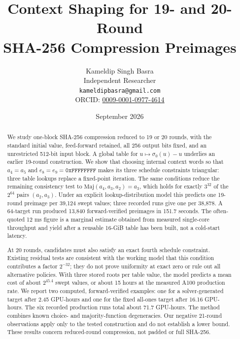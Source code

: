 \documentclass[11pt,a4paper]{article}
\newcommand{\Maj}{\mathrm{Maj}}
\newcommand{\hex}[1]{\texttt{#1}}
\begin{document}
\title{\textbf{Context Shaping for 19- and 20-Round\\
       SHA-256 Compression Preimages}}

\author{Kameldip Singh Basra \\[4pt]
        \small Independent Researcher \\
        \small \texttt{kameldipbasra@gmail.com} \\
        \small ORCID: \href{https://orcid.org/0009-0001-0977-4614}{0009-0001-0977-4614}}

\date{September 2026}

\maketitle

\begin{abstract}
\noindent
We study one-block SHA-256 compression reduced to 19 or 20 rounds, with the
standard initial value, feed-forward retained, all 256 output bits fixed, and
an unrestricted 512-bit input block.  A global table for
$u\mapsto\sigma_0(u)-u$ underlies an earlier 19-round construction.  We show
that choosing internal context words so that $a_4=a_5$ and
$e_8=e_9=\hex{0xFFFFFFFF}$ makes its three schedule constraints triangular:
three table lookups replace a fixed-point iteration.  The same conditions
reduce the remaining consistency test to
$\Maj(a_4,a_3,a_2)=a_3$, which holds for exactly $3^{32}$ of the $2^{64}$
pairs $(a_2,a_3)$.  Under an explicit lookup-distribution model this predicts
one 19-round preimage per 39{,}124 swept values; three recorded runs give one
per 38{,}878.  A 64-target run produced 13{,}840 forward-verified preimages in
151.7 seconds.  The often-quoted 12 ms figure is a marginal estimate obtained
from measured single-core throughput and yield after a reusable 16-GiB table
has been built, not a cold-start latency.

At 20 rounds, candidates must also satisfy an exact fourth schedule
constraint.  Existing residual tests are consistent with the working model
that this condition contributes a factor $2^{-32}$; they do not prove
uniformity at exact zero or rule out all alternative policies.  With three
stored roots per table value, the model predicts a mean cost of about
$2^{45.4}$ swept values, or about 15 hours at the measured A100 production
rate.  We report two computed, forward-verified examples: one
for a solver-generated target after 2.45 GPU-hours and one for the fixed
all-ones target after 16.16 GPU-hours.  The six recorded production runs total
about 71.7 GPU-hours.  The method combines known choice- and
majority-function degeneracies.  Our negative 21-round observations apply
only to the tested construction and do not establish a lower bound.  These
results concern reduced-round compression, not padded or full SHA-256.
\end{abstract}
\end{document}
